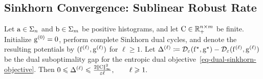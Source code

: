 \subsection{Sinkhorn Convergence: Sublinear Robust Rate}
\begin{prop}\label{prop-sinkhorn-dual-rate}
Let $\mathrm{a}\in\Sigma_n$ and $\mathrm{b}\in\Sigma_m$ be positive histograms, and let $\mathrm{C}\in\mathbb{R}_+^{n\times m}$ be finite.
Initialize $\mathrm{g}^{(0)}=0$, perform complete Sinkhorn dual cycles, and denote the resulting potentials by $(\mathrm{f}^{(\ell)},\mathrm{g}^{(\ell)})$ for $\ell\geq1$. Let
\(\Delta^{(\ell)} \coloneqq \mathcal{D}_\varepsilon(\mathrm{f}^\star,\mathrm{g}^\star) - \mathcal{D}_\varepsilon(\mathrm{f}^{(\ell)},\mathrm{g}^{(\ell)})\)
be the dual suboptimality gap for the entropic dual objective~\eqref{eq-dual-sinkhorn-objective}. Then
\(0\leqslant\Delta^{(\ell)}\leqslant \frac{2|\!| \mathrm{C} |\!|_\infty^2}{\varepsilon \ell}, \qquad \ell\geqslant1.\)
\end{prop}
